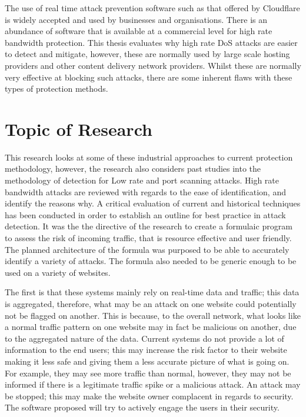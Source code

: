 The use of real time attack prevention software such as that offered by Cloudflare is widely accepted and used by businesses and organisations. There is an abundance of software that is available at a commercial level for high rate bandwidth protection. This thesis evaluates why high rate DoS attacks are easier to detect and mitigate, however, these are normally used by large scale hosting providers and other content delivery network providers. Whilst these are normally very effective at blocking such attacks, there are some inherent flaws with these types of protection methods. 

\section{Topic of Research}

This research looks at some of these industrial approaches to current protection methodology, however, the research also considers past studies into the methodology of detection for Low rate and port scanning attacks. High rate bandwidth attacks are reviewed with regards to the ease of identification, and identify the reasons why. A critical evaluation of current and historical techniques has been conducted in order to establish an outline for best practice in attack detection. It was the the directive of the research to create a formulaic program to assess the risk of incoming traffic, that is resource effective and user friendly. The planned architecture of the formula was purposed to be able to accurately identify a variety of attacks. The formula also needed to be generic enough to be used on a variety of websites.

The first is that these systems mainly rely on real-time data and traffic; this data is aggregated, therefore, what may be an attack on one website could potentially not be flagged on another. This is because, to the overall network, what looks like a normal traffic pattern on one website may in fact be malicious on another, due to the aggregated nature of the data. Current systems do not provide a lot of information to the end users; this may increase the risk factor to their website making it less safe and giving them a less accurate picture of what is going on. For example, they may see more traffic than normal, however, they may not be informed if there is a legitimate traffic spike or a malicious attack. An attack may be stopped; this may make the website owner complacent in regards to security. The software proposed will try to actively engage the users in their security.

